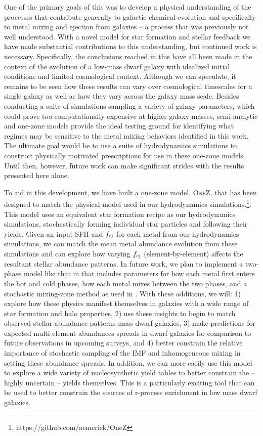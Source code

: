 One of the primary goals of this \dissertation was to develop a physical understanding of the processes that contribute generally to galactic chemical evolution and specifically to metal mixing and ejection from galaxies -- a process that was previously not well understood. With a novel model for star formation and stellar feedback we have made substantial contributions to this understanding, but continued work is necessary. Specifically, the conclusions reached in this \dissertation have all been made in the context of the evolution of a low-mass dwarf galaxy with idealized initial conditions and limited cosmological context. Although we can speculate, it remains to be seen how these results can vary over cosmological timescales for a single galaxy as well as how they vary across the galaxy mass scale. Besides conducting a suite of simulations sampling a variety of galaxy parameters, which could prove too computationally expensive at higher galaxy masses, semi-analytic and one-zone models provide the ideal testing ground for identifying what regimes may be sensitive to the metal mixing behaviors identified in this work. The ultimate goal would be to use a suite of hydrodynamics simulations to construct physically motivated prescriptions for use in these one-zone models. Until then, however, future work can make significant strides with the results presented here alone.

To aid in this development, we have built a one-zone model, \textsc{OneZ}, that has been designed to match the physical model used in our hydrodynamics simulations.\footnote{https://github.com/aemerick/OneZ}. This model uses an equivalent star formation recipe as our hydrodynamics simulations, stochastically forming individual star particles and following their yields. Given an input SFH and $f_{\rm ej}$ for each metal from our hydrodynamics simulations, we can match the mean metal abundance evolution from these simulations and can explore how varying $f_{\rm ej}$ (element-by-element) affects the resultant stellar abundance patterns. In future work, we plan to implement a two-phase model like that in \cite{SchonrichWeinberg2019} that includes parameters for how each metal first enters the hot and cold phases, how each metal mixes between the two phases, and a stochastic mixing-zone method as used in \cite{Cescutti2008}. With these additions, we will: 1) explore how these physics manifest themselves in galaxies with a wide range of star formation and halo properties, 2) use these insights to begin to match observed stellar abundance patterns mass dwarf galaxies, 3) make predictions for expected multi-element abundances spreads in dwarf galaxies for comparison to future observations in upcoming surveys, and 4) better constrain the relative importance of stochastic sampling of the IMF and inhomogeneous mixing in setting these abundance spreads. In addition, we can more easily use this model to explore a wide variety of nucleosynthetic yield tables to better constrain the -- highly uncertain -- yields themselves. This is a particularly exciting tool that can be used to better constrain the sources of r-process enrichment in low mass dwarf galaxies.
